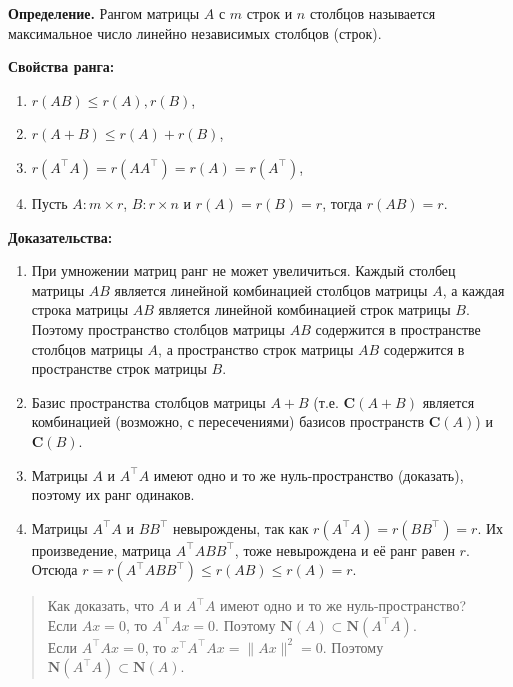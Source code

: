\documentclass[11pt,a4paper]{article}
\providecommand{\tightlist}{%
      \setlength{\itemsep}{0pt}\setlength{\parskip}{0pt}}
\begin{document}
    \textbf{Определение.} Рангом матрицы \(A\) с \(m\) строк и \(n\)
столбцов называется максимальное число линейно независимых столбцов
(строк).

    \textbf{Свойства ранга:}

\begin{enumerate}
\def\labelenumi{\arabic{enumi}.}
\tightlist
\item
  \(r(AB) \le r(A), r(B)\),
\item
  \(r(A+B) \le r(A) + r(B)\),
\item
  \(r(A^\top A) = r(AA^\top) = r(A) = r(A^\top)\),
\item
  Пусть \(A: m \times r\), \(B: r \times n\) и \(r(A) = r(B) = r\),
  тогда \(r(AB) = r\).
\end{enumerate}

\textbf{Доказательства:}

\begin{enumerate}
\def\labelenumi{\arabic{enumi}.}
\tightlist
\item
  При умножении матриц ранг не может увеличиться. Каждый столбец матрицы
  \(AB\) является линейной комбинацией столбцов матрицы \(A\), а каждая
  строка матрицы \(AB\) является линейной комбинацией строк матрицы
  \(B\). Поэтому пространство столбцов матрицы \(AB\) содержится в
  пространстве столбцов матрицы \(A\), а пространство строк матрицы
  \(AB\) содержится в пространстве строк матрицы \(B\).
\item
  Базис пространства столбцов матрицы \(A+B\) (т.е. \(\mathbf{C}(A+B)\)
  является комбинацией (возможно, с пересечениями) базисов пространств
  \(\mathbf{C}(A)\)) и \(\mathbf{C}(B)\).
\item
  Матрицы \(A\) и \(A^\top A\) имеют одно и то же нуль-пространство
  (доказать), поэтому их ранг одинаков.
\item
  Матрицы \(A^\top A\) и \(BB^\top\) невырождены, так как
  \(r(A^\top A) = r(BB^\top) = r\). Их произведение, матрица
  \(A^\top A BB^\top\), тоже невырождена и её ранг равен \(r\). Отсюда
  \(r = r(A^\top A BB^\top) \le r(AB) \le r(A) = r\).
\end{enumerate}

    \begin{quote}
Как доказать, что \(A\) и \(A^\top A\) имеют одно и то же
нуль-пространство?\\
Если \(Ax=0\), то \(A^\top Ax = 0\). Поэтому
\(\mathbf{N}(A) \subset \mathbf{N}(A^\top A)\).\\
Если \(A^\top Ax = 0\), то \(x^\top A^\top Ax = \|Ax\|^2 = 0\). Поэтому
\(\mathbf{N}(A^\top A) \subset \mathbf{N}(A)\).
\end{quote}
\end{document}
